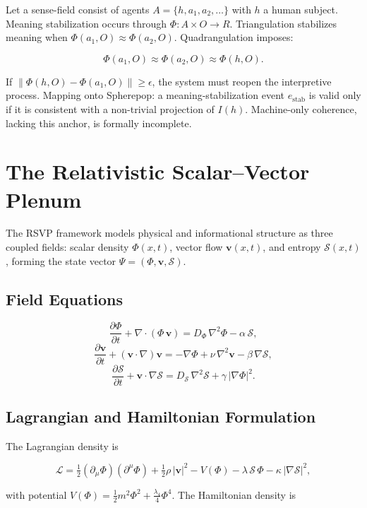 \documentclass[12pt,a4paper]{article}
\begin{document}
Let a sense-field consist of agents $A = \{h, a_1, a_2, \dots\}$ with $h$ a human subject.
Meaning stabilization occurs through $\Phi : A \times O \to R$. Triangulation stabilizes
meaning when $\Phi(a_1, O) \approx \Phi(a_2, O)$. Quadrangulation \citep{jelinek2026}
imposes:

\[
\Phi(a_1,O) \approx \Phi(a_2,O) \approx \Phi(h,O).
\]

If $\|\Phi(h,O) - \Phi(a_1,O)\| \geq \epsilon$, the system must reopen the interpretive
process. Mapping onto Spherepop: a meaning-stabilization event $e_{\mathrm{stab}}$ is valid
only if it is consistent with a non-trivial projection of $I(h)$. Machine-only coherence,
lacking this anchor, is formally incomplete.

\section{The Relativistic Scalar--Vector Plenum}

The RSVP framework models physical and informational structure as three coupled fields:
scalar density $\Phi(x,t)$, vector flow $\mathbf{v}(x,t)$, and entropy
$\mathcal{S}(x,t)$, forming the state vector $\Psi = (\Phi, \mathbf{v}, \mathcal{S})$.

\subsection*{Field Equations}

\[
\frac{\partial\Phi}{\partial t} + \nabla\cdot(\Phi\,\mathbf{v})
= D_\Phi\,\nabla^2\Phi - \alpha\,\mathcal{S},
\]
\[
\frac{\partial\mathbf{v}}{\partial t} + (\mathbf{v}\cdot\nabla)\mathbf{v}
= -\nabla\Phi + \nu\,\nabla^2\mathbf{v} - \beta\,\nabla\mathcal{S},
\]
\[
\frac{\partial\mathcal{S}}{\partial t} + \mathbf{v}\cdot\nabla\mathcal{S}
= D_\mathcal{S}\,\nabla^2\mathcal{S} + \gamma\,|\nabla\Phi|^2.
\]

\subsection*{Lagrangian and Hamiltonian Formulation}

The Lagrangian density is

\[
\mathcal{L}
= \tfrac{1}{2}(\partial_\mu\Phi)(\partial^\mu\Phi)
+ \tfrac{1}{2}\rho\,|\mathbf{v}|^2
- V(\Phi)
- \lambda\,\mathcal{S}\,\Phi
- \kappa\,|\nabla\mathcal{S}|^2,
\]

with potential $V(\Phi) = \tfrac{1}{2}m^2\Phi^2 + \tfrac{\lambda_4}{4}\Phi^4$. The
Hamiltonian density is
\end{document}
